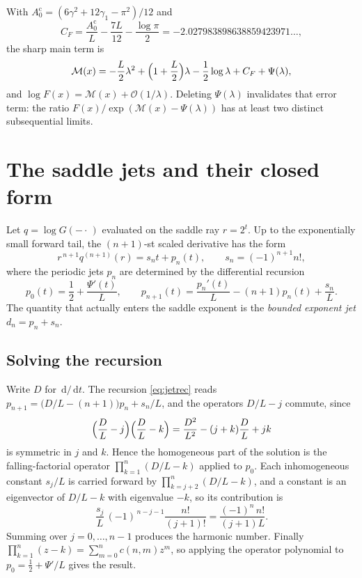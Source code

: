 \documentclass[11pt,oneside]{article}
\theoremstyle{definition}
\theoremstyle{remark}
\newcommand{\dd}{\,\mathrm d}
\newcommand{\bigO}{\mathcal O}
\begin{document}
With $A_0^{\mathrm{c}}=(6\gamma^2+12\gamma_1-\pi^2)/12$ and
\[
  C_F=\frac{A_0^{\mathrm{c}}}{L}-\frac{7L}{12}-\frac{\log\pi}{2}
     =-2.027983898638859423971\dots,
\]
the sharp main term is
\begin{equation}\label{eq:main}
  \mathcal M(x)=-\frac L2\lambda^2+\Bigl(1+\frac L2\Bigr)\lambda
    -\frac12\log\lambda+C_F+\Psi(\lambda),
\end{equation}
and $\log F(x)=\mathcal M(x)+\bigO(1/\lambda)$.  Deleting $\Psi(\lambda)$
invalidates that error term: the ratio $F(x)/\exp(\mathcal M(x)-\Psi(\lambda))$
has at least two distinct subsequential limits.

\section{The saddle jets and their closed form}\label{sec:jets}

Let $q=\log G(-\cdot\,)$ evaluated on the saddle ray $r=2^t$.  Up to the
exponentially small forward tail, the $(n+1)$-st scaled derivative has the form
\[
  r^{\,n+1}q^{(n+1)}(r)=s_nt+p_n(t),\qquad s_n=(-1)^{n+1}n!,
\]
where the periodic jets $p_n$ are determined by the differential recursion
\begin{equation}\label{eq:jetrec}
  p_0(t)=\frac12+\frac{\Psi'(t)}{L},
  \qquad
  p_{n+1}(t)=\frac{p_n'(t)}{L}-(n+1)p_n(t)+\frac{s_n}{L}.
\end{equation}
The quantity that actually enters the saddle exponent is the \emph{bounded
exponent jet} $d_n=p_n+s_n$.

\subsection{Solving the recursion}

Write $D$ for $\dd/\dd t$.  The recursion \cref{eq:jetrec} reads
$p_{n+1}=\bigl(D/L-(n+1)\bigr)p_n+s_n/L$, and the operators $D/L-j$ commute,
since
\[
  \Bigl(\frac DL-j\Bigr)\Bigl(\frac DL-k\Bigr)
   =\frac{D^2}{L^2}-(j+k)\frac DL+jk
\]
is symmetric in $j$ and $k$.  Hence the homogeneous part of the solution is the
falling-factorial operator $\prod_{k=1}^n(D/L-k)$ applied to $p_0$.  Each
inhomogeneous constant $s_j/L$ is carried forward by
$\prod_{k=j+2}^n(D/L-k)$, and a constant is an eigenvector of $D/L-k$ with
eigenvalue $-k$, so its contribution is
\[
  \frac{s_j}{L}\,(-1)^{\,n-j-1}\frac{n!}{(j+1)!}
   =\frac{(-1)^n\,n!}{(j+1)L}.
\]
Summing over $j=0,\dots,n-1$ produces the harmonic number.  Finally
$\prod_{k=1}^n(z-k)=\sum_{m=0}^nc(n,m)z^m$, so applying the operator polynomial
to $p_0=\tfrac12+\Psi'/L$ gives the result.
\end{document}
